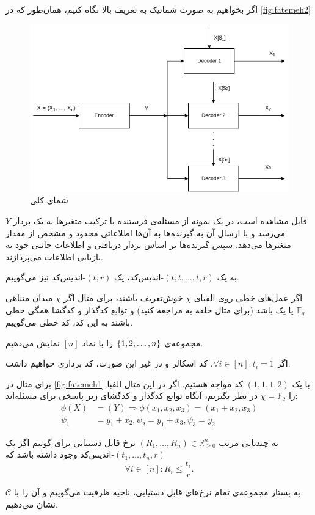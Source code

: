 اگر بخواهیم به صورت شماتیک به تعریف بالا نگاه کنیم، همان‌طور که در
\autoref{fig:fatemeh2}
\begin{figure}
	\centering
	\includegraphics[width=0.7\linewidth]{figs/chapter1/Diagram-drawio}
	\caption[
		شمای کلی 
	\icod
	]{
		شمای کلی 
		\icod
	\cite{fatemehbook}
	}
	\label{fig:fatemeh2}
\end{figure}
قابل مشاهده است، در یک نمونه از مسئله‌ی
\icod
فرستنده با ترکیب متغیرها به یک بردار
$Y$
می‌رسد و با ارسال آن به گیرنده‌ها به آن‌ها اطلاعاتی محدود و مشخص از مقدار متغیرها می‌دهد. سپس گیرنده‌ها بر اساس بردار دریافتی و اطلاعات جانبی خود به بازیابی اطلاعات می‌پردازند.

	به یک
	$(t, t, \ldots, t, r)$-اندیس‌کد،
	یک
	$(t, r)$-اندیس‌کد
	نیز می‌گوییم.
	
	اگر عمل‌های خطی روی الفبای
	$\chi$
	خوش‌تعریف باشند، برای مثال اگر
	$\chi$
	میدان متناهی
	$\mathbb{F}_q$
	یا یک 
	باشد
	 (برای مثال حلقه به 
	\cite{Connelly2018}
	مراجعه کنید) و توابع کدگذار و کدگشا همگی خطی باشند به این کد، کد خطی می‌گوییم. 
	\begin{notation}
		مجموعه‌ی
		$\left\{ 1, 2, \ldots, n \right\}$
		را با نماد
		$[n]$
		نمایش می‌دهیم.
	\end{notation}
	\begin{definition}
		\label{def:linearcode}
	اگر 
	$\forall i \in [n]: t_i = 1$،
	کد اسکالر و در غیر این‌ صورت، کد برداری خواهیم داشت.
	\end{definition}
	برای مثال در 
	\autoref{fig:fatemeh1}
	با یک 
	$(1, 1, 1, 2)$-کد
	مواجه هستیم. اگر در این مثال الفبا را
	$\chi = \mathbb{F}_2$
	در نظر بگیریم، آنگاه توابع کدگذار و کدگشای زیر پاسخی برای مسئله‌اند:
	\begin{align*}
	\phi(X) &= (Y) \Rightarrow \phi(x_1, x_2, x_3) = (x_1 + x_2, x_3) \\
	\psi_1 &= y_1 + x_2, \psi_2 = y_1 + x_3, \psi_3 = y_2
	\end{align*}
	\begin{definition}
		به چندتایی مرتب
		$(R_1, \ldots, R_n) \in \mathbb{R}_{\geqslant 0}^n$
		نرخ قابل دستیابی برای \icod گوییم اگر یک 
		$(t_1, \ldots, t_n, r)$-اندیس‌کد
		 وجود داشته باشد که
		$$\forall i \in [n]: R_i \leq \frac{t_i}{r}.$$
		\end{definition}
  \begin{definition}
  	به بستار مجموعه‌ی تمام نرخ‌های قابل دستیابی، ناحیه ظرفیت می‌گوییم و آن را با
		$\mathscr{C}$
		نشان می‌دهیم.
	\end{definition}
	
